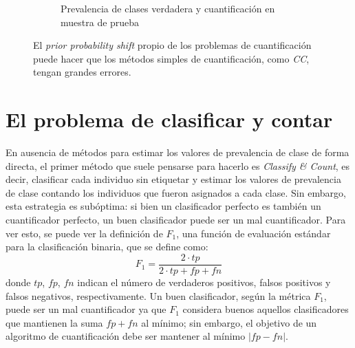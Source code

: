 \begin{figure}[H]
\begin{subfigure}[t]{0.36\textwidth}
        \caption{Prevalencia de clases verdadera y cuantificación en muestra de
        prueba}\label{cambios:cuantificacion_tst}
    \end{subfigure}
    \caption{El {\it prior probability shift\/} propio de los problemas de
    cuantificación puede hacer que los métodos simples de cuantificación, como
    {\it CC}, tengan grandes errores.}\label{fig:cambios}
\end{figure}

\section{El problema de clasificar y contar}\label{problema:clasificar_y_contar}

En ausencia de métodos para estimar los valores de prevalencia de clase de forma
directa, el primer método que suele pensarse para hacerlo es {\it Classify \&
Count}, es decir, clasificar cada individuo sin etiquetar y estimar los valores
de prevalencia de clase contando los individuos que fueron asignados a cada
clase. Sin embargo, esta estrategia es subóptima: si bien un clasificador
perfecto es también un cuantificador perfecto, un buen clasificador puede ser un
mal cuantificador. Para ver esto, se puede ver la definición de $F_1$, una
función de evaluación estándar para la clasificación binaria, que se define
como:
\begin{equation}
    F_1 = \frac{2 \cdot tp}{2 \cdot tp + fp + fn}
\end{equation}
donde $tp$, $fp$, $fn$ indican el número de verdaderos positivos, falsos
positivos y falsos negativos, respectivamente. Un buen clasificador, según la
métrica $F_1$, puede ser un mal cuantificador ya que $F_1$ considera buenos
aquellos clasificadores que mantienen la suma $fp + fn$ al mínimo; sin embargo,
el objetivo de un algoritmo de cuantificación debe ser mantener al mínimo
$|fp-fn|$.

